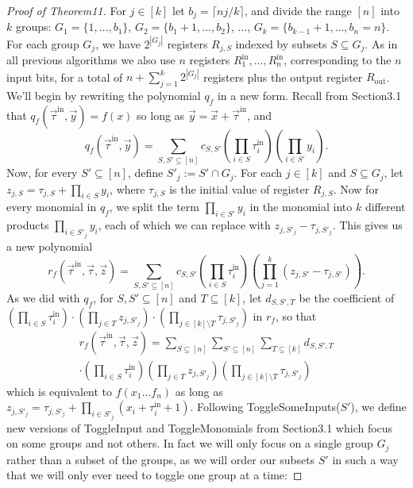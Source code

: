 \documentclass[10pt,a4paper]{article}
\begin{document}
\begin{proof}[Proof of Theorem11]
For $j\in[k]$ let $b_j=\lceil nj/k\rceil$, and divide the range $[n]$ into $k$ groups: $G_1=\{1,\ldots,b_1\}$, $G_2=\{b_1+1,\ldots,b_2\}$, $\ldots$, $G_k=\{b_{k-1}+1,\ldots,b_n=n\}$. For each group $G_j$, we have $2^{|G_j|}$ registers $R_{j,S}$ indexed by subsets $S\subseteq G_j$. As in all previous algorithms we also use $n$ registers $R_1^{\mathrm{in}},\ldots,R_n^{\mathrm{in}}$, corresponding to the $n$ input bits, for a total of $n+\sum_{j=1}^k2^{|G_j|}$ registers plus the output register $R_{\mathrm{out}}$.
We'll begin by rewriting the polynomial $q_f$ in a new form. Recall from Section3.1 that $q_f(\vec\tau^{\mathrm{in}},\vec y)=f(x)$ so long as $\vec y=\vec x+\vec\tau^{\mathrm{in}}$, and
\[q_f(\vec\tau^{\mathrm{in}},\vec y)=\sum_{S,S'\subseteq[n]}c_{S,S'}\left(\prod_{i\in S}\tau_i^{\mathrm{in}}\right)\left(\prod_{i\in S'}y_i\right).\]
Now, for every $S'\subseteq[n]$, define $S'_j:=S'\cap G_j$. For each $j\in[k]$ and $S\subseteq G_j$, let $z_{j,S}=\tau_{j,S}+\prod_{i\in S}y_i$, where $\tau_{j,S}$ is the initial value of register $R_{j,S}$. Now for every monomial in $q_f$, we split the term $\prod_{i\in S'}y_i$ in the monomial into $k$ different products $\prod_{i\in S'_j}y_i$, each of which we can replace with $z_{j,S'_j}-\tau_{j,S'_j}$. This gives us a new polynomial
\[r_f(\vec\tau^{\mathrm{in}},\vec\tau,\vec z)=\sum_{S,S'\subseteq[n]}c_{S,S'}\left(\prod_{i\in S}\tau_i^{\mathrm{in}}\right)\left(\prod_{j=1}^k(z_{j,S'}-\tau_{j,S'})\right).\]
As we did with $q_f$, for $S,S'\subseteq[n]$ and $T\subseteq[k]$, let $d_{S,S',T}$ be the coefficient of $(\prod_{i\in S}\tau_i^{\mathrm{in}})\cdot(\prod_{j\in T}z_{j,S'_j})\cdot(\prod_{j\in[k]\setminus T}\tau_{j,S'_j})$ in $r_f$, so that
\begin{multline*}
r_f(\vec\tau^{\mathrm{in}},\vec\tau,\vec z)=\sum_{S\subseteq[n]}\sum_{S'\subseteq[n]}\sum_{T\subseteq[k]}d_{S,S',T}\\
\cdot\left(\prod_{i\in S}\tau_i^{\mathrm{in}}\right)\left(\prod_{j\in T}z_{j,S'_j}\right)\left(\prod_{j\in[k]\setminus T}\tau_{j,S'_j}\right)
\end{multline*}
which is equivalent to $f(x_1\ldots f_n)$ as long as $z_{j,S'_j}=\tau_{j,S'_j}+\prod_{i\in S'_j}(x_i+\tau_i^{\mathrm{in}}+1)$.
Following ToggleSomeInputs($S'$), we define new versions of ToggleInput and ToggleMonomials from Section3.1 which focus on some groups and not others. In fact we will only focus on a single group $G_j$ rather than a subset of the groups, as we will order our subsets $S'$ in such a way that we will only ever need to toggle one group at a time:

\end{proof}
\end{document}
